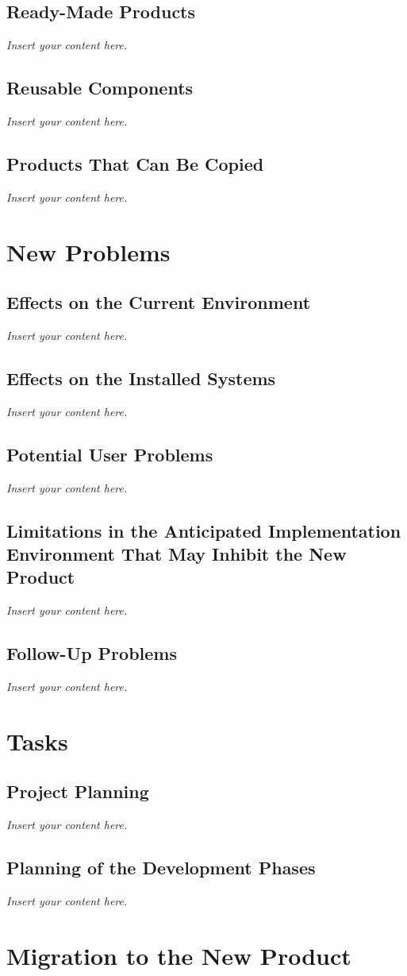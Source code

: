\documentclass[12pt]{article}
\newcommand{\lips}{\textit{Insert your content here.}}
\begin{document}
\subsection{Ready-Made Products}
\lips
\subsection{Reusable Components}
\lips
\subsection{Products That Can Be Copied}
\lips

\section{New Problems}
\subsection{Effects on the Current Environment}
\lips
\subsection{Effects on the Installed Systems}
\lips
\subsection{Potential User Problems}
\lips
\subsection{Limitations in the Anticipated Implementation Environment That May
  Inhibit the New Product}
\lips
\subsection{Follow-Up Problems}
\lips

\section{Tasks}
\subsection{Project Planning}
\lips
\subsection{Planning of the Development Phases}
\lips

\section{Migration to the New Product}
\end{document}
